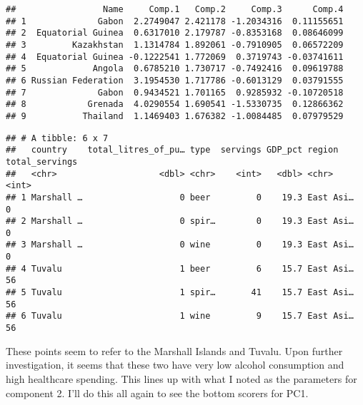 \documentclass[]{article}
\newenvironment{Shaded}{\begin{snugshade}}{\end{snugshade}}
\newcommand{\KeywordTok}[1]{\textcolor[rgb]{0.13,0.29,0.53}{\textbf{#1}}}
\newcommand{\DataTypeTok}[1]{\textcolor[rgb]{0.13,0.29,0.53}{#1}}
\newcommand{\DecValTok}[1]{\textcolor[rgb]{0.00,0.00,0.81}{#1}}
\newcommand{\StringTok}[1]{\textcolor[rgb]{0.31,0.60,0.02}{#1}}
\newcommand{\OperatorTok}[1]{\textcolor[rgb]{0.81,0.36,0.00}{\textbf{#1}}}
\newcommand{\NormalTok}[1]{#1}
\begin{document}
\begin{verbatim}
##                 Name     Comp.1   Comp.2     Comp.3      Comp.4
## 1              Gabon  2.2749047 2.421178 -1.2034316  0.11155651
## 2  Equatorial Guinea  0.6317010 2.179787 -0.8353168  0.08646099
## 3         Kazakhstan  1.1314784 1.892061 -0.7910905  0.06572209
## 4  Equatorial Guinea -0.1222541 1.772069  0.3719743 -0.03741611
## 5             Angola  0.6785210 1.730717 -0.7492416  0.09619788
## 6 Russian Federation  3.1954530 1.717786 -0.6013129  0.03791555
## 7              Gabon  0.9434521 1.701165  0.9285932 -0.10720518
## 8            Grenada  4.0290554 1.690541 -1.5330735  0.12866362
## 9           Thailand  1.1469403 1.676382 -1.0084485  0.07979529
\end{verbatim}

\begin{Shaded}
\end{Shaded}

\begin{verbatim}
## # A tibble: 6 x 7
##   country    total_litres_of_pu… type  servings GDP_pct region    total_servings
##   <chr>                    <dbl> <chr>    <int>   <dbl> <chr>              <int>
## 1 Marshall …                   0 beer         0    19.3 East Asi…              0
## 2 Marshall …                   0 spir…        0    19.3 East Asi…              0
## 3 Marshall …                   0 wine         0    19.3 East Asi…              0
## 4 Tuvalu                       1 beer         6    15.7 East Asi…             56
## 5 Tuvalu                       1 spir…       41    15.7 East Asi…             56
## 6 Tuvalu                       1 wine         9    15.7 East Asi…             56
\end{verbatim}

These points seem to refer to the Marshall Islands and Tuvalu. Upon
further investigation, it seems that these two have very low alcohol
consumption and high healthcare spending. This lines up with what I
noted as the parameters for component 2. I'll do this all again to see
the bottom scorers for PC1.

\begin{Shaded}
\end{Shaded}
\end{document}
